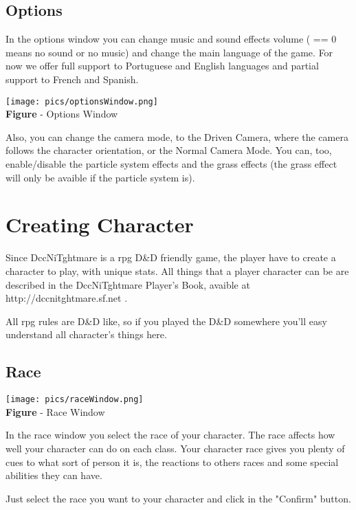 \documentclass[ letterpaper,12pt]{article}
\begin{document}
\subsection{Options}

In the options window you can change music and sound effects volume ( == 0
means no sound or no music) and change the main language of the game. For now
we offer full support to Portuguese and English languages and partial support
to French and Spanish.

\begin{center}
  \texttt{[image: pics/optionsWindow.png]}
\\{\bf Figure} - Options Window
\end{center}

Also, you can change the camera mode, to the Driven Camera, where the camera
follows the character orientation, or the Normal Camera Mode. You can, too,
enable/disable the particle system effects and the grass effects (the grass
effect will only be avaible if the particle system is).

\section{Creating Character}

Since DccNiTghtmare is a rpg D\&D friendly game, the player have to create a
character to play, with unique stats. All things that a player character can be
are described in the DccNiTghtmare Player's Book, avaible at
http://dccnitghtmare.sf.net .

All rpg rules are D\&D like, so if you played the D\&D somewhere you'll easy
understand all character's things here.

\subsection{Race}

\begin{center}
  \texttt{[image: pics/raceWindow.png]}
\\{\bf Figure} - Race Window
\end{center}

In the race window you select the race of your character. The race affects how
well your character can do on each class. Your character race gives you plenty
of cues to what sort of person it is, the reactions to others races and some
special abilities they can have.

Just select the race you want to your character and click in the "Confirm"
button.
\end{document}
